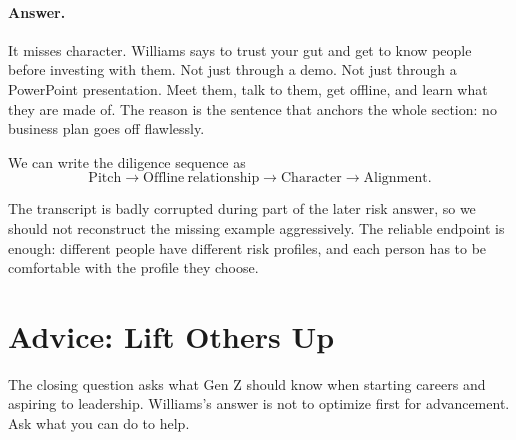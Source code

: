 \paragraph{Answer.} It misses character. Williams says to trust your gut and get to know people before investing with them. Not just through a demo. Not just through a PowerPoint presentation. Meet them, talk to them, get offline, and learn what they are made of. The reason is the sentence that anchors the whole section: no business plan goes off flawlessly.

We can write the diligence sequence as
\begin{equation}
\mathrm{Pitch}
\longrightarrow
\mathrm{Offline\ relationship}
\longrightarrow
\mathrm{Character}
\longrightarrow
\mathrm{Alignment}.
\end{equation}

\begin{figure}
\centering
{}
\end{figure}

The transcript is badly corrupted during part of the later risk answer, so we should not reconstruct the missing example aggressively. The reliable endpoint is enough: different people have different risk profiles, and each person has to be comfortable with the profile they choose.

\section{Advice: Lift Others Up}

The closing question asks what Gen Z should know when starting careers and aspiring to leadership. Williams's answer is not to optimize first for advancement. Ask what you can do to help.

